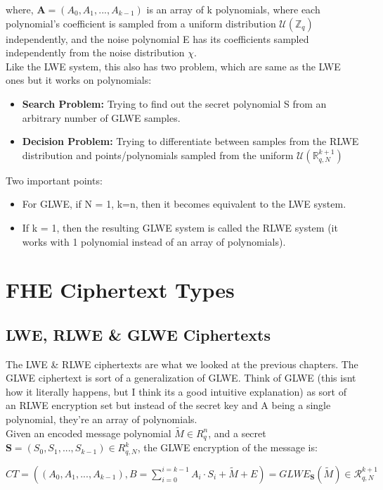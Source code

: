 \documentclass{report}
\begin{document}
where, $\textbf{A} = (A_0, A_1, ..., A_{k-1})$ is an array of k polynomials, where each polynomial's coefficient is sampled from a uniform distribution $\mathcal{U}(\mathbb{Z}_q)$ independently, and the noise polynomial E has its coefficients sampled independently from the noise distribution $\chi$.\\
Like the LWE system, this also has two problem, which are same as the LWE ones but it works on polynomials:
\begin{itemize}
	\item \textbf{Search Problem:} Trying to find out the secret polynomial S from an arbitrary number of GLWE samples.
	\item \textbf{Decision Problem:} Trying to differentiate between samples from the RLWE distribution and points/polynomials sampled from the uniform $\mathcal{U}(\mathbb{R}_{q, N}^{k+1})$
\end{itemize}

Two important points:
\begin{itemize}
	\item For GLWE, if N = 1, k=n, then it becomes equivalent to the LWE system.
	\item If k = 1, then the resulting GLWE system is called the RLWE system (it works with 1 polynomial instead of an array of polynomials).
\end{itemize}


\section{FHE Ciphertext Types}
\subsection{LWE, RLWE \& GLWE Ciphertexts}
The LWE \& RLWE ciphertexts are what we looked at the previous chapters. The GLWE ciphertext is sort of a generalization of GLWE. Think of GLWE (this isnt how it literally happens, but I think its a good intuitive explanation) as sort of an RLWE encryption set but instead of the secret key and A being a single polynomial, they're an array of polynomials.\\
Given an encoded message polynomial $\tilde{M} \in R_q^n$, and a secret $\textbf{S} = (S_0, S_1, ..., S_{k-1}) \in R_{q, N}^k$, the GLWE encryption of the message is:
\begin{center}
	$CT = ((A_0, A_1, ..., A_{k-1}), B = \sum\limits_{i=0}^{i=k-1} A_i \cdot S_i + \tilde{M} + E) = GLWE_{\textbf{S}}(\tilde{M}) \in \mathcal{R}_{q, N}^{k+1}$
\end{center}
\end{document}
